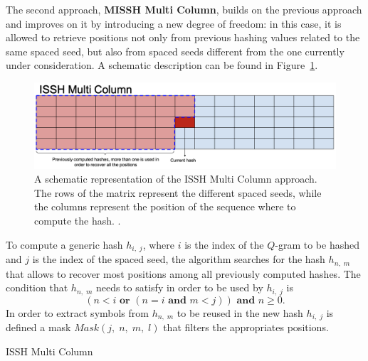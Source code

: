 The second approach, \textbf{MISSH Multi Column}, builds on the previous approach and improves on it by introducing a new degree of freedom: in this case, it is allowed to retrieve positions not only from previous hashing values related to the same spaced seed, but also from spaced seeds different from the one currently under consideration. A schematic description can be found in Figure~\ref{fig:issh_multi_column}.

\begin{figure}[!ht]
	\centering
	\includegraphics[width=0.85\linewidth]{images/issh_multi_column}
	\caption[A schematic representation of the ISSH Multi Column approach]{A schematic representation of the ISSH Multi Column approach. The rows of the matrix represent the different spaced seeds, while the columns represent the position of the sequence where to compute the hash. \cite{mian2023missh}.}
	\label{fig:issh_multi_column}
\end{figure}

To compute a generic hash $h_{i,\; j}$, where $i$ is the index of the $Q$-gram to be hashed and $j$ is the index of the spaced seed, the algorithm searches for the hash $h_{n,\; m}$ that allows to recover most positions among all previously computed hashes. The condition that $h_{n,\; m}$ needs to satisfy in order to be used by $h_{i,\; j}$ is \begin{equation}\label{eq:issh_multi_column_condition}
	(n < i \textbf{ or } (n = i \textbf{ and } m < j)) \textbf{ and } n \geq 0.
\end{equation}
In order to extract symbols from $h_{n,\; m}$ to be reused in the new hash $h_{i,\; j}$ is defined a mask $Mask(j,\; n,\; m,\; l)$ that filters the appropriates positions.

\begin{algorithm}[!ht]
	\caption{ISSH Multi Column}
	\label{alg:ISSH_multi_column}
\end{algorithm}

